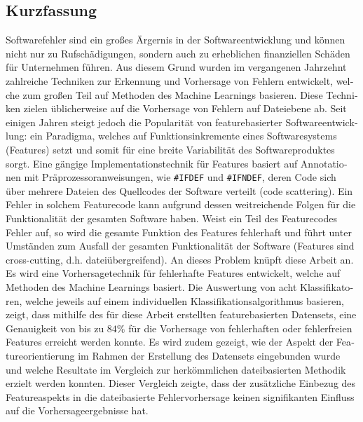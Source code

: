 
\begin{otherlanguage}{ngerman}
    \section*{Kurzfassung}

Softwarefehler sind ein großes Ärgernis in der Softwareentwicklung und können nicht nur zu Rufschädigungen, sondern auch zu erheblichen finanziellen Schäden für Unternehmen führen. Aus diesem Grund wurden im vergangenen Jahrzehnt zahlreiche Techniken zur Erkennung und Vorhersage von Fehlern entwickelt, welche zum großen Teil auf Methoden des Machine Learnings basieren. Diese Techniken zielen üblicherweise auf die Vorhersage von Fehlern auf Dateiebene ab. Seit einigen Jahren steigt jedoch die Popularität von featurebasierter Softwareentwicklung: ein Paradigma, welches auf Funktionsinkremente eines Softwaresystems (Features) setzt und somit für eine breite Variabilität des Softwareproduktes sorgt. Eine gängige Implementationstechnik für Features basiert auf Annotationen mit Präprozessoranweisungen, wie \texttt{\#IFDEF} und \texttt{\#IFNDEF}, deren Code sich über mehrere Dateien des Quellcodes der Software verteilt (\glqq code scattering\grqq). Ein Fehler in solchem Featurecode kann aufgrund dessen weitreichende Folgen für die Funktionalität der gesamten Software haben. Weist ein Teil des Featurecodes Fehler auf, so wird die gesamte Funktion des Features fehlerhaft und führt unter Umständen zum Ausfall der gesamten Funktionalität der Software (Features sind \glqq cross-cutting\grqq, d.h. dateiübergreifend). An dieses Problem knüpft diese Arbeit an. Es wird eine Vorhersagetechnik für fehlerhafte Features entwickelt, welche auf Methoden des Machine Learnings basiert. Die Auswertung von acht Klassifikatoren, welche jeweils auf einem individuellen Klassifikationsalgorithmus basieren, zeigt, dass mithilfe des für diese Arbeit erstellten featurebasierten Datensets, eine Genauigkeit von bis zu $84\%$ für die Vorhersage von fehlerhaften oder fehlerfreien Features erreicht werden konnte. Es wird zudem gezeigt, wie der Aspekt der Featureorientierung im Rahmen der Erstellung des Datensets eingebunden wurde und welche Resultate im Vergleich zur herkömmlichen dateibasierten Methodik erzielt werden konnten. Dieser Vergleich zeigte, dass der zusätzliche Einbezug des Featureaspekts in die dateibasierte Fehlervorhersage keinen signifikanten Einfluss auf die Vorhersageergebnisse hat.

\end{otherlanguage}

